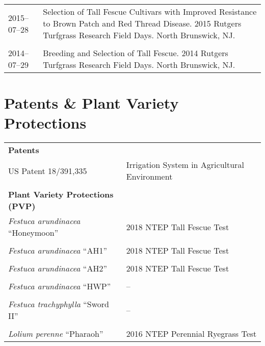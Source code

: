 \documentclass[letterpaper,11pt, english]{article}
\begin{document}
\begin{flushleft}
  \begin{tabularx}{\textwidth}{@{}lX@{}}
    2015--07--28 \hspace{1cm} & Selection of Tall Fescue Cultivars with Improved Resistance to Brown Patch and Red Thread Disease. 2015 Rutgers Turfgrass Research Field Days. North Brunswick, NJ. \\
    \\[-0.2cm] 
    2014--07--29 \hspace{1cm} & Breeding and Selection of Tall Fescue. 2014 Rutgers Turfgrass Research Field Days. North Brunswick, NJ. \\
      \end{tabularx}
    \end{flushleft}

    \section{Patents \& Plant Variety Protections}
    \begin{flushleft}
    \begin{tabularx}{\textwidth}{@{}p{7cm}X@{}}
        \textbf{Patents} & \\
        US Patent 18/391,335 & Irrigation System in Agricultural Environment \\
        \\[-0.2cm]
        
        \textbf{Plant Variety Protections (PVP)} & \\
        \textit{Festuca arundinacea} “Honeymoon” & 2018 NTEP Tall Fescue Test \\
        \\[-0.2cm]
        \textit{Festuca arundinacea} “AH1” & 2018 NTEP Tall Fescue Test \\
        \\[-0.2cm]
        \textit{Festuca arundinacea} “AH2” & 2018 NTEP Tall Fescue Test \\
        \\[-0.2cm]
        \textit{Festuca arundinacea} “HWP” & – \\
        \\[-0.2cm]
        \textit{Festuca trachyphylla} “Sword II” & – \\
        \\[-0.2cm]
        \textit{Lolium perenne} “Pharaoh” & 2016 NTEP Perennial Ryegrass Test \\
    \end{tabularx}
    \end{flushleft}
\end{document}
